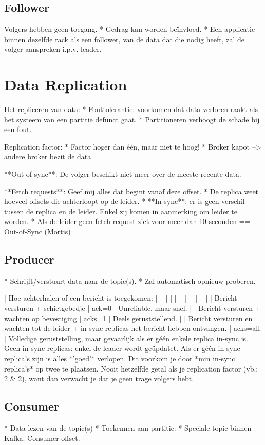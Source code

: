 \documentclass[a4paper,10pt,twoside]{report}
\begin{document}
\subsection{Follower}

Volgers hebben geen toegang. 
* Gedrag kan worden beïnvloed.
* Een applicatie binnen dezelfde rack als een follower, van de data dat die nodig heeft, zal de volger aanspreken i.p.v. leader.


\section{Data Replication}
Het repliceren van data:
* Fouttolerantie: voorkomen dat data verloren raakt als het systeem van een partitie defunct gaat.
* Partitioneren verhoogt de schade bij een fout.

Replication factor:
* Factor hoger dan één, maar niet te hoog!
* Broker kapot --> andere broker bezit de data

**Out-of-sync**: De volger beschikt niet meer over de meeste recente data.

**Fetch requests**: Geef mij alles dat begint vanaf deze offset.
* De replica weet hoeveel offsets die achterloopt op de leider.
* **In-sync**: er is geen verschil tussen de replica en de leider. Enkel zij komen in aanmerking om leider te worden.
* Als de leider geen fetch request ziet voor meer dan 10 seconden == Out-of-Sync (Mortis)

\subsection{Producer}
* Schrijft/verstuurt data naar de topic(s).
* Zal automatisch opnieuw proberen.

| Hoe achterhalen of een bericht is toegekomen: | -- | |
| -- | -- | -- |
| Bericht versturen + schietgebedje | ack=0 | Unreliable, maar snel. |
| Bericht versturen + wachten op bevestiging | acks=1 | Deels geruststellend. |
| Bericht versturen en wachten tot de leider + in-sync replicas het bericht hebben ontvangen. | acks=all | Volledige geruststelling, maar gevaarlijk als er géén enkele replica in-sync is. Geen in-sync replicas: enkel de leader wordt geüpdatet. Als er géén in-sync replica's zijn is alles *'goed'* verlopen. Dit voorkom je door *min in-sync replica's* op twee te plaatsen. Nooit hetzelfde getal als je replication factor (vb.: 2 & 2), want dan verwacht je dat je geen trage volgers hebt. |

\subsection{Consumer}
* Data lezen van de topic(s)
* Toekennen aan partitie:
* Speciale topic binnen Kafka: Consumer offset.
\end{document}
